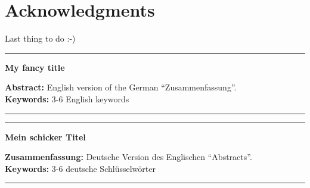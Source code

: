 \documentclass[a4paper,11pt,twoside]{ThesisStyle}
\begin{document}



\dominitoc


 \cleardoublepage

\section*{Acknowledgments}

Last thing to do :-)

\tableofcontents

\mainmatter






\appendix







\cleardoublepage
\begin{vcenterpage}
\noindent\rule[2pt]{\textwidth}{0.5pt}
\begin{center}
{\large\textbf{My fancy title\\}}
\end{center}
{\large\textbf{Abstract:}}
English version of the German ``Zusammenfassung''.\\

{\large\textbf{Keywords:}}
3-6 English keywords
\\
\noindent\rule[2pt]{\textwidth}{0.5pt}
\end{vcenterpage}

\clearpage
\begin{vcenterpage}
\noindent\rule[2pt]{\textwidth}{0.5pt}
\begin{center}
{\large\textbf{Mein schicker Titel\\}}
\end{center}
{\large\textbf{Zusammenfassung:}}
Deutsche Version des Englischen ``Abstracts''.\\

{\large\textbf{Keywords:}}
3-6 deutsche Schl\"usselw\"orter
\\
\noindent\rule[2pt]{\textwidth}{0.5pt}
\end{vcenterpage}
\end{document}
